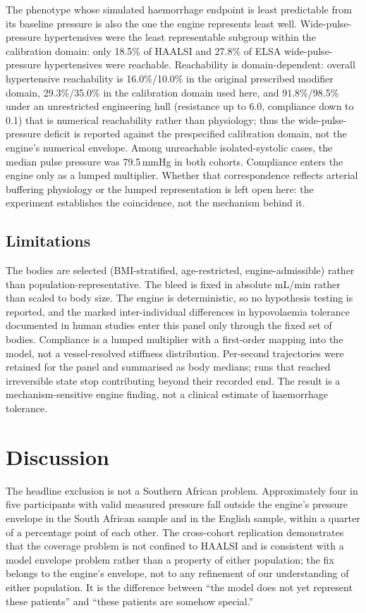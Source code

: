 \documentclass[preprint,12pt,nopreprintline]{elsarticle}
\begin{document}
The phenotype whose simulated haemorrhage endpoint is least predictable from its baseline pressure is also the one the engine represents least well. Wide-pulse-pressure hypertensives were the least representable subgroup within the calibration domain: only 18.5\% of HAALSI and 27.8\% of ELSA wide-pulse-pressure hypertensives were reachable. Reachability is domain-dependent: overall hypertensive reachability is 16.0\%/10.0\% in the original prescribed modifier domain, 29.3\%/35.0\% in the calibration domain used here, and 91.8\%/98.5\% under an unrestricted engineering hull (resistance up to 6.0, compliance down to 0.1) that is numerical reachability rather than physiology; thus the wide-pulse-pressure deficit is reported against the prespecified calibration domain, not the engine's numerical envelope. Among unreachable isolated-systolic cases, the median pulse pressure was 79.5\,mmHg in both cohorts. Compliance enters the engine only as a lumped multiplier. Whether that correspondence reflects arterial buffering physiology or the lumped representation is left open here: the experiment establishes the coincidence, not the mechanism behind it.

\subsection{Limitations}

The bodies are selected (BMI-stratified, age-restricted, engine-admissible) rather than population-representative. The bleed is fixed in absolute mL/min rather than scaled to body size. The engine is deterministic, so no hypothesis testing is reported, and the marked inter-individual differences in hypovolaemia tolerance documented in human studies \cite{xiang2018} enter this panel only through the fixed set of bodies. Compliance is a lumped multiplier with a first-order mapping into the model, not a vessel-resolved stiffness distribution. Per-second trajectories were retained for the panel and summarised as body medians; runs that reached irreversible state stop contributing beyond their recorded end. The result is a mechanism-sensitive engine finding, not a clinical estimate of haemorrhage tolerance.

\section{Discussion}

The headline exclusion is not a Southern African problem. Approximately four in five participants with valid measured pressure fall outside the engine's pressure envelope in the South African sample and in the English sample, within a quarter of a percentage point of each other. The cross-cohort replication demonstrates that the coverage problem is not confined to HAALSI and is consistent with a model envelope problem rather than a property of either population; the fix belongs to the engine's envelope, not to any refinement of our understanding of either population. It is the difference between ``the model does not yet represent these patients'' and ``these patients are somehow special.''
\end{document}
